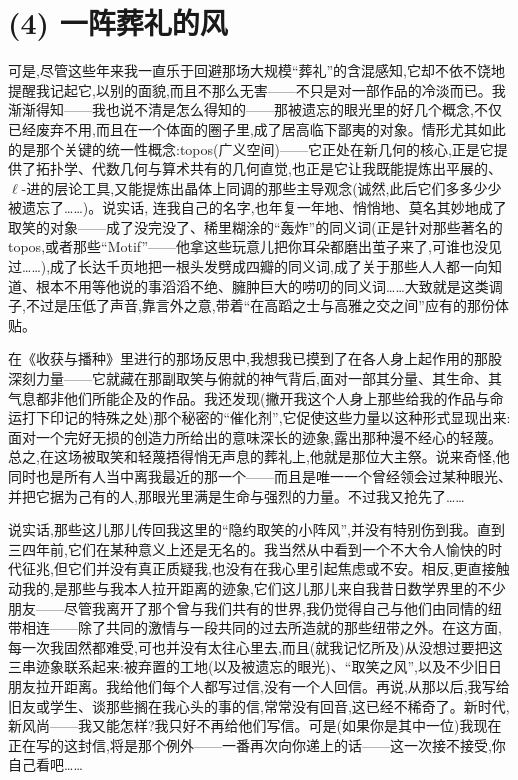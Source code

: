 \section{(4) 一阵葬礼的风}

可是,尽管这些年来我一直乐于回避那场大规模“葬礼”的含混感知,它却不依不饶地提醒我记起它,以别的面貌,而且不那么无害——不只是对一部作品的冷淡而已。我渐渐得知——我也说不清是怎么得知的——那被遗忘的眼光里的好几个概念,不仅已经废弃不用,而且在一个体面的圈子里,成了居高临下鄙夷的对象。情形尤其如此的是那个关键的统一性概念:topos(广义空间)——它正处在新几何的核心,正是它提供了拓扑学、代数几何与算术共有的几何直觉,也正是它让我既能提炼出平展的、$\ell$-进的层论工具,又能提炼出晶体上同调的那些主导观念(诚然,此后它们多多少少被遗忘了……)。说实话,
连我自己的名字,也年复一年地、悄悄地、莫名其妙地成了取笑的对象——成了没完没了、稀里糊涂的“轰炸”的同义词(正是针对那些著名的 topos,或者那些“Motif”——他拿这些玩意儿把你耳朵都磨出茧子来了,可谁也没见过……),成了长达千页地把一根头发劈成四瓣的同义词,成了关于那些人人都一向知道、根本不用等他说的事滔滔不绝、臃肿巨大的唠叨的同义词……大致就是这类调子,不过是压低了声音,靠言外之意,带着“在高蹈之士与高雅之交之间”应有的那份体贴。

在《收获与播种》里进行的那场反思中,我想我已摸到了在各人身上起作用的那股深刻力量——它就藏在那副取笑与俯就的神气背后,面对一部其分量、其生命、其气息都非他们所能企及的作品。我还发现(撇开我这个人身上那些给我的作品与命运打下印记的特殊之处)那个秘密的“催化剂”,它促使这些力量以这种形式显现出来:面对一个完好无损的创造力所给出的意味深长的迹象,露出那种漫不经心的轻蔑。总之,在这场被取笑和轻蔑捂得悄无声息的葬礼上,他就是那位大主祭。说来奇怪,他同时也是所有人当中离我最近的那一个——而且是唯一一个曾经领会过某种眼光、并把它据为己有的人,那眼光里满是生命与强烈的力量。不过我又抢先了……

说实话,那些这儿那儿传回我这里的“隐约取笑的小阵风”,并没有特别伤到我。直到三四年前,它们在某种意义上还是无名的。我当然从中看到一个不大令人愉快的时代征兆,但它们并没有真正质疑我,也没有在我心里引起焦虑或不安。相反,更直接触动我的,是那些与我本人拉开距离的迹象,它们这儿那儿来自我昔日数学界里的不少朋友——尽管我离开了那个曾与我们共有的世界,我仍觉得自己与他们由同情的纽带相连——除了共同的激情与一段共同的过去所造就的那些纽带之外。在这方面,每一次我固然都难受,可也并没有太往心里去,而且(就我记忆所及)从没想过要把这三串迹象联系起来:被弃置的工地(以及被遗忘的眼光)、“取笑之风”,以及不少旧日朋友拉开距离。我给他们每个人都写过信,没有一个人回信。再说,从那以后,我写给旧友或学生、谈那些搁在我心头的事的信,常常没有回音,这已经不稀奇了。新时代,新风尚——我又能怎样?我只好不再给他们写信。可是(如果你是其中一位)我现在正在写的这封信,将是那个例外——一番再次向你递上的话——这一次接不接受,你自己看吧……

